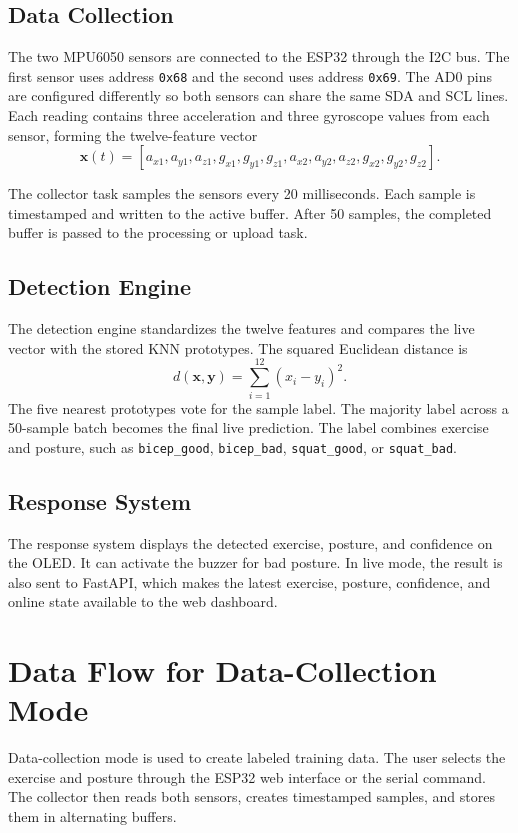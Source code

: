 \subsection{Data Collection}
The two MPU6050 sensors are connected to the ESP32 through the I2C bus. The first
sensor uses address \texttt{0x68} and the second uses address \texttt{0x69}. The
AD0 pins are configured differently so both sensors can share the same SDA and SCL
lines. Each reading contains three acceleration and three gyroscope values from each
sensor, forming the twelve-feature vector
\begin{equation}
\mathbf{x}(t) = [a_{x1},a_{y1},a_{z1},g_{x1},g_{y1},g_{z1},
a_{x2},a_{y2},a_{z2},g_{x2},g_{y2},g_{z2}].
\end{equation}

The collector task samples the sensors every 20 milliseconds. Each sample is
timestamped and written to the active buffer. After 50 samples, the completed
buffer is passed to the processing or upload task.

\subsection{Detection Engine}
The detection engine standardizes the twelve features and compares the live vector
with the stored KNN prototypes. The squared Euclidean distance is
\begin{equation}
d(\mathbf{x},\mathbf{y}) = \sum_{i=1}^{12}(x_i-y_i)^2.
\end{equation}
The five nearest prototypes vote for the sample label. The majority label across a
50-sample batch becomes the final live prediction. The label combines exercise and
posture, such as \texttt{bicep\_good}, \texttt{bicep\_bad}, \texttt{squat\_good}, or
\texttt{squat\_bad}.

\subsection{Response System}
The response system displays the detected exercise, posture, and confidence on the
OLED. It can activate the buzzer for bad posture. In live mode, the result is also
sent to FastAPI, which makes the latest exercise, posture, confidence, and online
state available to the web dashboard.

\section{Data Flow for Data-Collection Mode}
Data-collection mode is used to create labeled training data. The user selects the
exercise and posture through the ESP32 web interface or the serial command. The
collector then reads both sensors, creates timestamped samples, and stores them in
alternating buffers.

